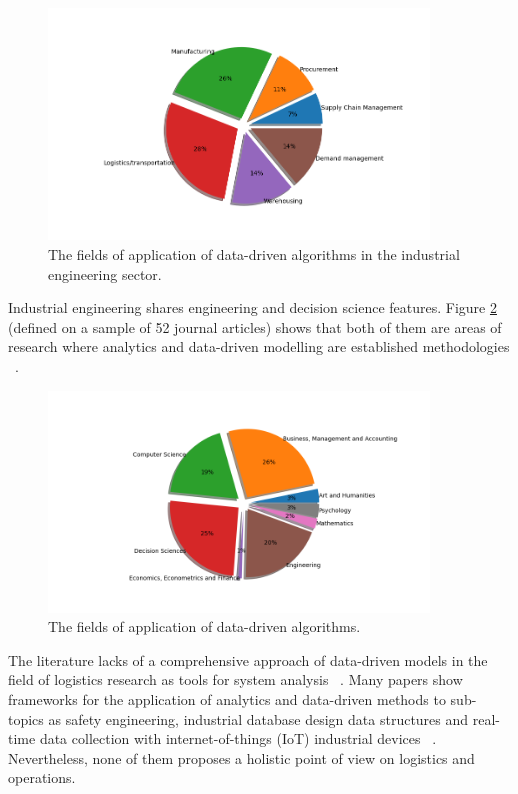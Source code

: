 \begin{figure}[hbt!]
\centering
\includegraphics[width=0.9\textwidth]{SectionIntroduction/researchBackground_figures/fig_literature_pie.png}
\captionsetup{type=figure}
\caption{The fields of application of data-driven algorithms in the industrial engineering sector.}
\label{fig_literature_pie}
\end{figure}

Industrial engineering shares engineering and decision science features. Figure \ref{fig_topics_pie} (defined on a sample of 52 journal articles) shows that both of them are areas of research where analytics and data-driven modelling are established methodologies ~\cite{Gupta2019}.

\begin{figure}[hbt!]
\centering
\includegraphics[width=0.9\textwidth]{SectionIntroduction/researchBackground_figures/fig_topics_pie.png}
\captionsetup{type=figure}
\caption{The fields of application of data-driven algorithms.}
\label{fig_topics_pie}
\end{figure}

The literature lacks of a comprehensive approach of data-driven models in the field of logistics research as tools for system analysis ~\cite{Wang2016, Lamba2018}. Many papers show frameworks for the application of analytics and data-driven methods to sub-topics as safety engineering, industrial database design data structures and real-time data collection with internet-of-things (IoT) industrial devices ~\cite{Huang2018, Zhang2018}. Nevertheless, none of them proposes a holistic point of view on logistics and operations.\par

